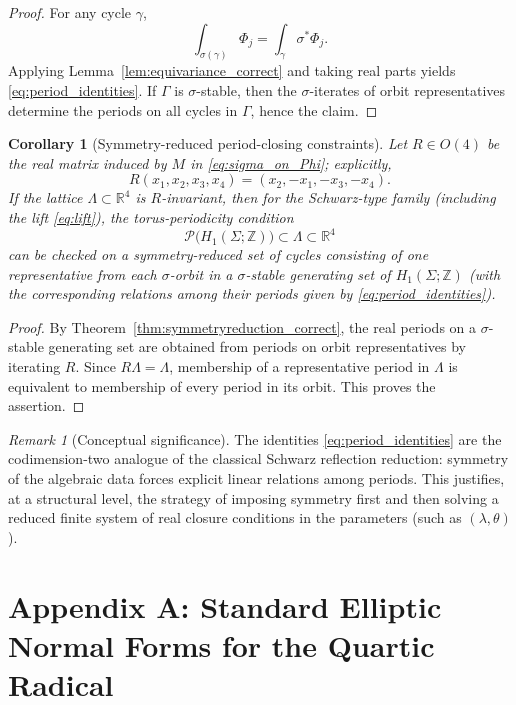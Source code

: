 \documentclass[12pt]{article}
\numberwithin{equation}{section}
\newtheorem{corollary}[theorem]{Corollary}
\theoremstyle{definition}
\theoremstyle{remark}
\newtheorem{remark}[theorem]{Remark}
\begin{document}
\begin{proof}
For any cycle $\gamma$,
\[
\int_{\sigma(\gamma)}\Phi_j=\int_\gamma \sigma^*\Phi_j.
\]
Applying Lemma~\ref{lem:equivariance_correct} and taking real parts yields \eqref{eq:period_identities}.
If $\Gamma$ is $\sigma$-stable, then the $\sigma$-iterates of orbit representatives determine the periods on all cycles in $\Gamma$, hence the claim.
\end{proof}

\begin{corollary}[Symmetry-reduced period-closing constraints]\label{cor:periodreduction_correct}
Let $R\in O(4)$ be the real matrix induced by $M$ in \eqref{eq:sigma_on_Phi}; explicitly,
\[
R(x_1,x_2,x_3,x_4)=(x_2,-x_1,-x_3,-x_4).
\]
If the lattice $\Lambda\subset\mathbb{R}^4$ is $R$-invariant, then for the Schwarz-type family (including the lift \eqref{eq:lift}), the torus-periodicity condition
\[
\mathcal{P}\bigl(H_1(\Sigma;\mathbb{Z})\bigr)\subset\Lambda\subset\mathbb{R}^4
\]
can be checked on a symmetry-reduced set of cycles consisting of one representative from each $\sigma$-orbit in a $\sigma$-stable generating set of $H_1(\Sigma;\mathbb{Z})$ (with the corresponding relations among their periods given by \eqref{eq:period_identities}).
\end{corollary}

\begin{proof}
By Theorem~\ref{thm:symmetryreduction_correct}, the real periods on a $\sigma$-stable generating set are obtained from periods on orbit representatives by iterating $R$.  Since $R\Lambda=\Lambda$, membership of a representative period in $\Lambda$ is equivalent to membership of every period in its orbit.  This proves the assertion.
\end{proof}

\begin{remark}[Conceptual significance]
The identities \eqref{eq:period_identities} are the codimension-two analogue of the classical Schwarz reflection reduction: symmetry of the algebraic data forces explicit linear relations among periods.
This justifies, at a structural level, the strategy of imposing symmetry first and then solving a reduced finite system of real closure conditions in the parameters (such as $(\lambda,\theta)$).
\end{remark}

\section*{Appendix A: Standard Elliptic Normal Forms for the Quartic Radical} \label{sec:appendixA}
\end{document}
